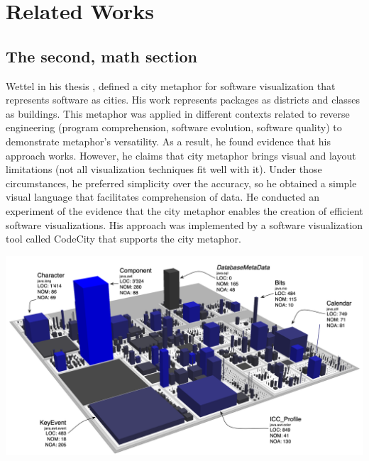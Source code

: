 
\chapter[Related Works]{Related Works}
\graphicspath{ {images/stateOfArt} }

\section{The second, math section}
Wettel in his thesis \cite{Wettel2011}, defined a city metaphor for software visualization that represents software as cities. His work represents packages as districts and classes as buildings. This metaphor was applied in different contexts related to reverse engineering (program comprehension, software evolution, software quality) to demonstrate metaphor's versatility. As a result, he found evidence that his approach works. However, he claims that city metaphor brings visual and layout limitations (not all visualization techniques fit well with it). Under those circumstances, he preferred simplicity over the accuracy, so he obtained a simple visual language that facilitates comprehension of data. 
He conducted an experiment of the evidence that the city metaphor enables the creation of efficient software visualizations. His approach was implemented by a software visualization tool called CodeCity that supports the city metaphor. 

\includegraphics[width=\textwidth]{CodeCity.png}